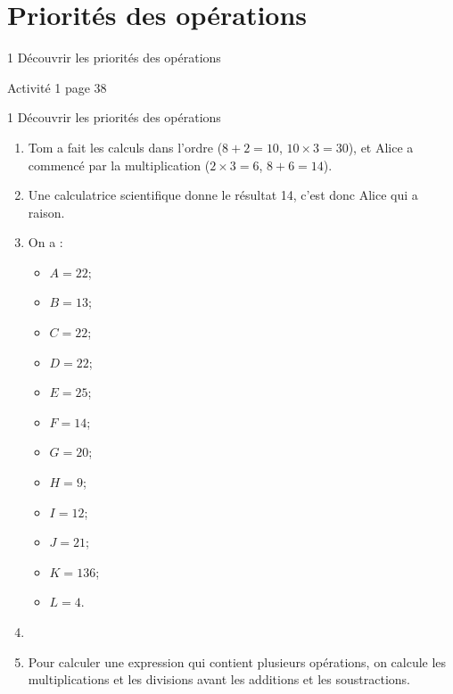 \documentclass[12pt,a4paper]{article}
\date{}
\title{}
\begin{document}




\section{Priorités des opérations}

\begin{myact}{1 Découvrir les priorités des opérations}

	Activité 1 page 38
\end{myact}

\begin{myactrep}{1 Découvrir les priorités des opérations}
	
	\begin{enumerate}
		\item Tom a fait les calculs dans l'ordre ($8 + 2 = 10$, $10 \times 3 = 30$), et Alice a commencé par la multiplication ($2 \times 3 = 6$, $8 + 6 = 14$).
		
		\item Une calculatrice scientifique donne le résultat 14, c'est donc Alice qui a raison.
		
		\item On a :
		
		\begin{multicols}{4}
			\begin{itemize}
				\item $A = 22 $;
				\item $B = 13 $;
				\item $C = 22 $;
				\item $D = 22 $;
				\item $E = 25 $;
				\item $F = 14 $;
				\item $G = 20 $;
				\item $H = 9 $;
				\item $I = 12 $;
				\item $J = 21 $;
				\item $K = 136 $;
				\item $L = 4 $.
			\end{itemize}
		\end{multicols}
	
		\item 
		
		\item Pour calculer une expression qui contient plusieurs opérations, on calcule les multiplications et les divisions avant les additions et les soustractions.
	\end{enumerate}
\end{myactrep}
\end{document}
